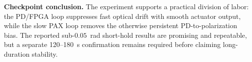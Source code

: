 \documentclass[10pt]{article}
\begin{document}
\textbf{Checkpoint conclusion.} The experiment supports a practical division of labor: the PD/FPGA loop suppresses fast optical drift with smooth actuator output, while the slow PAX loop removes the otherwise persistent PD-to-polarization bias. The reported sub-$0.05$~rad short-hold results are promising and repeatable, but a separate 120--180~s confirmation remains required before claiming long-duration stability.
\end{document}
